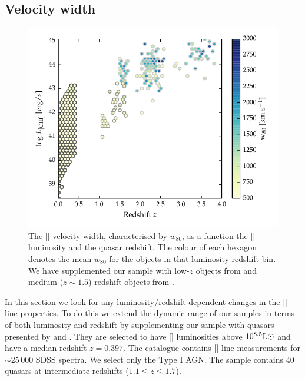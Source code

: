\subsection{Velocity width}

\begin{figure}
    \includegraphics[width=\columnwidth]{figures/chapter04/oiii_luminosity_z_w80.pdf} 
    \caption[{The [] velocity-width, characterised by $w_{80}$, as a function the [] luminosity and the quasar redshift.}]{The [] velocity-width, characterised by $w_{80}$, as a function the [] luminosity and the quasar redshift. The colour of each hexagon denotes the mean $w_{80}$ for the objects in that luminosity-redshift bin. We have supplemented our sample with low-$z$ objects from \citet{zakamska14} and medium ($z\sim1.5$) redshift objects from \citet{harrison16}.}       
    \label{fig:oiii_luminosity_z_w80}
\end{figure}

In this section we look for any luminosity/redshift dependent changes in the [] line properties. 
To do this we extend the dynamic range of our samples in terms of both luminosity and redshift by supplementing our sample with quasars presented by \citet{mullaney13} and \citet{harrison16}. 
They are selected to have [] luminosities above $10^{8.5}{\rm L}\odot$ and have a median redshift $z=0.397$. 
The \citet{mullaney13} catalogue contains [] line measurements for $\sim$25\,000 SDSS spectra. 
We select only the Type I AGN. 
The \citet{harrison16} sample contains 40 quasars at intermediate redshifts ($1.1 \leq z \leq 1.7$).

